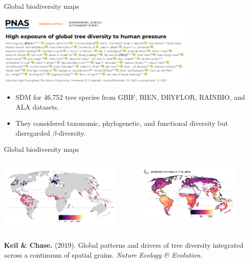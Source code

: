 \documentclass[10pt,table,dvipsnames,compress]{beamer}
\begin{document}
\begin{frame}[label={sec:orgb7e9e5b}]{Global biodiversity maps}
\begin{center}
\includegraphics[width=10cm]{figs/biodiv/Guo2022-title.png}
\end{center}

\begin{itemize}
\item SDM for 46,752 tree species from GBIF, BIEN, DRYFLOR, RAINBIO, and ALA datasets.
\item They considered taxonomic, phylogenetic, and functional diversity but disregarded \(\beta\)-diversity.
\end{itemize}
\end{frame}

\begin{frame}[label={sec:org940add2}]{Global biodiversity maps}
\begin{columns}
\begin{column}{0.5\columnwidth}
\begin{center}
\includegraphics[width=6cm]{figs/biodiv/Keil2019-figure.png}
\end{center}
\end{column}

\begin{column}{0.5\columnwidth}
\begin{center}
\includegraphics[width=5cm]{figs/biodiv/Keil2019-figure-2.png}
\end{center}
\end{column}
\end{columns}

\textbf{Keil \& Chase.} (2019). Global patterns and drivers of tree diversity integrated across a continuum of spatial grains. \emph{Nature Ecology \& Evolution}.
\end{frame}
\end{document}
